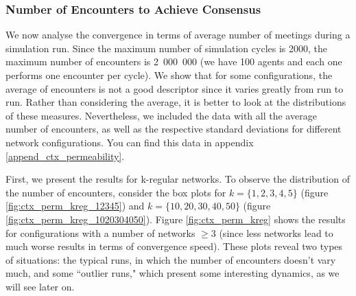 \documentclass[preprint,number]{elsarticle}
\begin{document}
      \subsubsection{Number of Encounters to Achieve Consensus}
      \label{sec:ctx_perm_encounters}
      \noindent We now analyse the convergence in terms of average number of meetings during a
      simulation run. Since the maximum number of simulation cycles is 2000, the maximum number of
      encounters is 2~000~000 (we have 100 agents and each one performs one encounter per cycle). We
      show that for some configurations, the average of encounters is not a good descriptor since it
      varies greatly from run to run. Rather than considering the average, it is better to look at
      the distributions of these measures. Nevertheless, we included the data with all the average
      number of encounters, as well as the respective standard deviations for different network
      configurations. You can find this data in appendix \ref{append_ctx_permeability}.

      First, we present the results for k-regular networks. To observe the distribution of the
      number of encounters, consider the box plots for $k = \{1,2,3,4,5\}$ (figure
      \ref{fig:ctx_perm_kreg_12345}) and $k =\{10,20,30,40,50\}$ (figure
      \ref{fig:ctx_perm_kreg_1020304050}). Figure \ref{fig:ctx_perm_kreg} shows the results for
      configurations with a number of networks $\ge 3$ (since less networks lead to much worse
      results in terms of convergence speed). These plots reveal two types of situations: the
      typical runs, in which the number of encounters doesn't vary much, and some ``outlier runs,"
      which present some interesting dynamics, as we will see later on.
\end{document}
